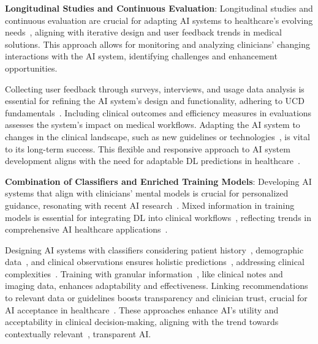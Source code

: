 \vspace{2.00mm}

\noindent
\textcolor{revised}{{\bf Longitudinal Studies and Continuous Evaluation}:
Longitudinal studies and continuous evaluation are crucial for adapting \ac{AI} systems to healthcare's evolving needs~\cite{STADIN2021106486}, aligning with iterative design and user feedback trends in medical solutions.
This approach allows for monitoring and analyzing clinicians' changing interactions with the \ac{AI} system, identifying challenges and enhancement opportunities.}

\vspace{2.00mm}

\textcolor{revised}{Collecting user feedback through surveys, interviews, and usage data analysis is essential for refining the \ac{AI} system's design and functionality, adhering to \ac{UCD} fundamentals~\cite{10.1145/3313831.3376718}.
Including clinical outcomes and efficiency measures in evaluations assesses the system's impact on medical workflows.
Adapting the \ac{AI} system to changes in the clinical landscape, such as new guidelines or technologies~\cite{10.1145/3397481.3450668}, is vital to its long-term success.
This flexible and responsive approach to \ac{AI} system development aligns with the need for adaptable \ac{DL} predictions in healthcare~\cite{10.1145/3563657.3596058}.}

\vspace{2.00mm}

\noindent
\textcolor{revised}{{\bf Combination of Classifiers and Enriched Training Models}:
Developing \ac{AI} systems that align with clinicians' mental models is crucial for personalized guidance, resonating with recent \ac{AI} research~\cite{10.1145/3359206}.
Mixed information in training models is essential for integrating \ac{DL} into clinical workflows~\cite{doi:10.1148/radiol.2018181371}, reflecting trends in comprehensive \ac{AI} healthcare applications~\cite{CORONATO2020101964}.}

\vspace{2.00mm}

\textcolor{revised}{Designing \ac{AI} systems with classifiers considering patient history~\cite{10.1145/3538882.3542790}, demographic data~\cite{Sollini2020}, and clinical observations ensures holistic predictions~\cite{10.1145/3079765}, addressing clinical complexities~\cite{Uddin2019}.
Training with granular information~\cite{Park:2015:TOA:2737795.2656213}, like clinical notes and imaging data, enhances adaptability and effectiveness.
Linking recommendations to relevant data or guidelines boosts transparency and clinician trust, crucial for \ac{AI} acceptance in healthcare~\cite{10.1145/3411764.3445432}.
These approaches enhance \ac{AI}'s utility and acceptability in clinical decision-making, aligning with the trend towards contextually relevant~\cite{10.1145/3397481.3450668}, transparent \ac{AI}.}

